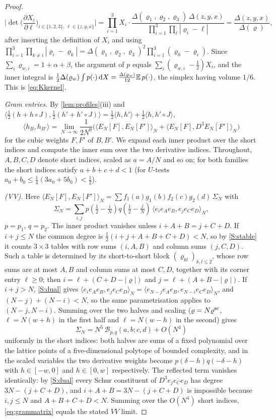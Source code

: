 \documentclass[11pt,colorlinks]{charlie}
\newcommand{\ip}[2]{\langle #1,#2\rangle}
\begin{document}
\begin{proof}
\[
 \Big|\det\Big(\frac{\partial X_i}{\partial\ell}\Big)_{i\in\{1,2,3\},\ \ell\in\{z,y,x\}}\Big|=\prod_{i=1}^3X_i\cdot\frac{\Delta(\varrho_1,\varrho_2,\varrho_3)\,\Delta(z,y,x)}{\prod_{i=1}^3\prod_\ell|\varrho_i-\ell|}=\frac{\Delta(z,y,x)}{\Delta(\varrho)},
\]
after inserting the definition of $X_i$ and using $\prod_{i=1}^3\prod_{k\ne i}|\varrho_i-\varrho_k|=\Delta(\varrho_1,\varrho_2,\varrho_3)^2\prod_{i=1}^3(\varrho_0-\varrho_i)$. Since $\sum_i\varrho_{w,i}=1+\alpha+\beta$, the argument of $p$ equals $\sum_i(\varrho_{w,i}-\frac12)X_i$, and the inner integral is $\frac12\Delta(\varrho_w)\int p(\cdot)\,\mathrm{d} X=\frac{\Delta(\varrho_w)}{12}\mathbb{E}\,p(\cdot)$, the simplex having volume $1/6$. This is \eqref{eq:Kkernel}.

\emph{Gram entries.} By \cref{lem:profiles}(iii) and $\ip{\frac12(h+h\circ J)}{\frac12(h'+h'\circ J)}=\frac12\ip h{h'}+\frac12\ip h{h'\circ J}$,
\begin{equation}\label{eq:grammatrix}
 \ip{h_B}{h_{B'}}=\lim_{N\to\infty}\frac1{2N^9}\Big(\ip{E_N[F]}{E_N[F']}_N+\ip{E_N[F]}{D^3\overline{E_N[F']}}_N\Big)
\end{equation}
for the cubic weights $F,F'$ of $B,B'$. We expand each inner product over the short indices and compute the inner sum over the two derivative indices. Throughout, $A,B,C,D$ denote short indices, scaled as $a=A/N$ and so on; for both families the short indices satisfy $a+b+c+d<1$ (for $U$-tests $a_0+b_0\le\frac14(3a_0+5b_0)<\frac12$).

\emph{(VV).} Here $\ip{E_N[F]}{E_N[F']}_N=\sum f_1(a)g_1(b)f_2(c)g_2(d)\,\Sigma_N$ with
\[
 \Sigma_N=\sum_{i,j}p(\tfrac12-\tfrac iN)q(\tfrac12-\tfrac jN)\,\ip{e_ie_Ae_B}{e_je_Ce_D}_N ,
\]
$p=p_1$, $q=p_2$. The inner product vanishes unless $i+A+B=j+C+D$. If $i+j\le N$ the common degree is $\frac12(i+j+A+B+C+D)<N$, so by \ref{S:stable} it counts $3\times3$ tables with row sums $(i,A,B)$ and column sums $(j,C,D)$. Such a table is determined by its short-to-short block $(\varrho_{kl})_{k,l\le2}$, whose row sums are at most $A,B$ and column sums at most $C,D$, together with its corner entry $\ell\ge0$; then $i=\ell+(C+D-|\varrho|)$ and $j=\ell+(A+B-|\varrho|)$. If $i+j>N$, \ref{S:dual} gives $\ip{e_ie_Ae_B}{e_je_Ce_D}_N=\ip{e_{N-j}e_Ae_B}{e_{N-i}e_Ce_D}_N$, and $(N-j)+(N-i)<N$, so the same parametrisation applies to $(N-j,N-i)$. Summing over the two halves and scaling ($\varrho=N\varrho^{\rm sc}$, $\ell=N(w+h)$ in the first half and $\ell=N(w-h)$ in the second) gives
\[
 \Sigma_N=N^5\,\mathcal B_{p,q}(a,b;c,d)+O(N^4)
\]
uniformly in the short indices: both halves are sums of a fixed polynomial over the lattice points of a five-dimensional polytope of bounded complexity, and in the scaled variables the two derivative weights become $p(\delta-h)q(-\delta-h)$ with $h\in[-w,0]$ and $h\in[0,w]$ respectively. The reflected term vanishes identically: by \ref{S:dual} every Schur constituent of $D^3\overline{e_je_Ce_D}$ has degree $3N-(j+C+D)$, and $i+A+B=3N-(j+C+D)$ is impossible because $i,j\le N$ and $A+B+C+D<N$. Summing over the $O(N^4)$ short indices, \eqref{eq:grammatrix} equals the stated $VV$ limit.


\end{proof}
\end{document}
